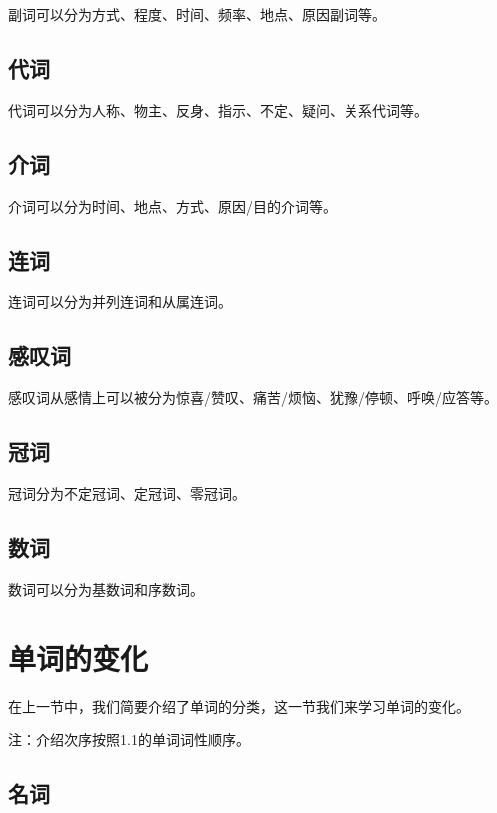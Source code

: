 \documentclass[UTF8]{ctexbook}
\begin{document}
副词可以分为方式、程度、时间、频率、地点、原因副词等。

\subsection{代词}

代词可以分为人称、物主、反身、指示、不定、疑问、关系代词等。

\subsection{介词}

介词可以分为时间、地点、方式、原因/目的介词等。

\subsection{连词}

连词可以分为并列连词和从属连词。

\subsection{感叹词}

感叹词从感情上可以被分为惊喜/赞叹、痛苦/烦恼、犹豫/停顿、呼唤/应答等。

\subsection{冠词}

冠词分为不定冠词、定冠词、零冠词。

\subsection{数词}

数词可以分为基数词和序数词。

\section{单词的变化}

在上一节中，我们简要介绍了单词的分类，这一节我们来学习单词的变化。

注：介绍次序按照1.1的单词词性顺序。

\subsection{名词}
\end{document}

